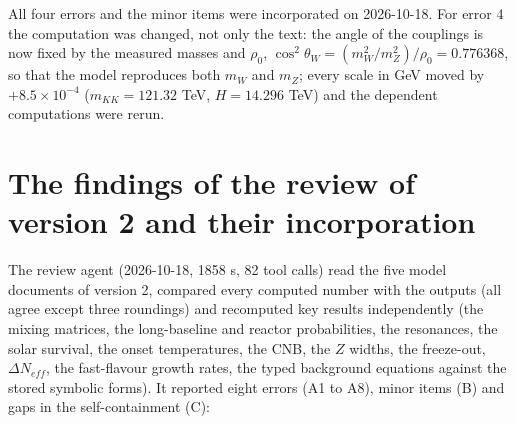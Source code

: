 \documentclass[
  10pt,
]{article}
\begin{document}
All four errors and the minor items were incorporated on 2026-10-18. For
error 4 the computation was changed, not only the text: the angle of the
couplings is now fixed by the measured masses and \(\rho_0\),
\(\cos^2\theta_W = (m_W^2/m_Z^2)/\rho_0 = 0.776368\), so that the model
reproduces both \(m_W\) and \(m_Z\); every scale in GeV moved by
\(+8.5\times10^{-4}\) (\(m_{KK} = 121.32\) TeV, \(H = 14.296\) TeV) and
the dependent computations were rerun.

\hypertarget{the-findings-of-the-review-of-version-2-and-their-incorporation}{%
\section{The findings of the review of version 2 and their
incorporation}\label{the-findings-of-the-review-of-version-2-and-their-incorporation}}

The review agent (2026-10-18, 1858 s, 82 tool calls) read the five model
documents of version 2, compared every computed number with the outputs
(all agree except three roundings) and recomputed key results
independently (the mixing matrices, the long-baseline and reactor
probabilities, the resonances, the solar survival, the onset
temperatures, the CNB, the \(Z\) widths, the freeze-out,
\(\Delta N_{eff}\), the fast-flavour growth rates, the typed background
equations against the stored symbolic forms). It reported eight errors
(A1 to A8), minor items (B) and gaps in the self-containment (C):
\end{document}
